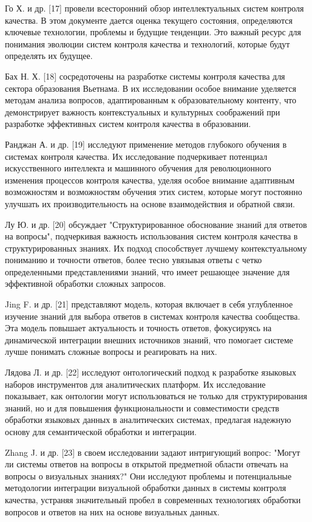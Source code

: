 \begin{multicols}{2}
Го Х. и др. {[}17{]} провели всесторонний обзор интеллектуальных систем
контроля качества. В этом документе дается оценка текущего состояния,
определяются ключевые технологии, проблемы и будущие тенденции. Это
важный ресурс для понимания эволюции систем контроля качества и
технологий, которые будут определять их будущее.

Бах Н. Х. {[}18{]} сосредоточены на разработке системы контроля качества
для сектора образования Вьетнама. В их исследовании особое внимание
уделяется методам анализа вопросов, адаптированным к образовательному
контенту, что демонстрирует важность контекстуальных и культурных
соображений при разработке эффективных систем контроля качества в
образовании.

Ранджан А. и др. {[}19{]} исследуют применение методов глубокого
обучения в системах контроля качества. Их исследование подчеркивает
потенциал искусственного интеллекта и машинного обучения для
революционного изменения процессов контроля качества, уделяя особое
внимание адаптивным возможностям и возможностям обучения этих систем,
которые могут постоянно улучшать их производительность на основе
взаимодействия и обратной связи.

Лу Ю. и др. {[}20{]} обсуждает "Структурированное обоснование знаний для
ответов на вопросы", подчеркивая важность использования систем контроля
качества в структурированных знаниях. Их подход способствует лучшему
контекстуальному пониманию и точности ответов, более тесно увязывая
ответы с четко определенными представлениями знаний, что имеет решающее
значение для эффективной обработки сложных запросов.

Jing F. и др. {[}21{]} представляют модель, которая включает в себя
углубленное изучение знаний для выбора ответов в системах контроля
качества сообщества. Эта модель повышает актуальность и точность
ответов, фокусируясь на динамической интеграции внешних источников
знаний, что помогает системе лучше понимать сложные вопросы и
реагировать на них.

Лядова Л. и др. {[}22{]} исследуют онтологический подход к разработке
языковых наборов инструментов для аналитических платформ. Их
исследование показывает, как онтологии могут использоваться не только
для структурирования знаний, но и для повышения функциональности и
совместимости средств обработки языковых данных в аналитических
системах, предлагая надежную основу для семантической обработки и
интеграции.

Zhang J. и др. {[}23{]} в своем исследовании задают интригующий вопрос:
"Могут ли системы ответов на вопросы в открытой предметной области
отвечать на вопросы о визуальных знаниях?" Они исследуют проблемы и
потенциальные методологии интеграции визуальной обработки данных в
системы контроля качества, устраняя значительный пробел в современных
технологиях обработки вопросов и ответов на них на основе визуальных
данных.


\end{multicols}
